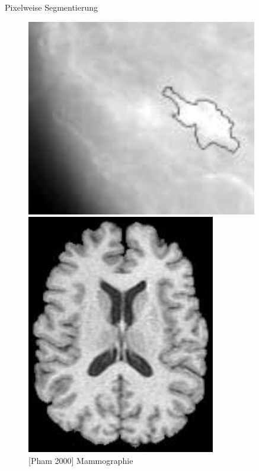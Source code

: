 \begin{frame}{Pixelweise Segmentierung}
    \begin{figure}[ht]
        \begin{minipage}[b]{0.45\linewidth}
            \centering
            \includegraphics[width=\textwidth]{../images/mammography.png}
            \caption{[Pham 2000] Mammographie}
            \label{fig:mammographie}
        \end{minipage}
        \hspace{0.5cm}
        \begin{minipage}[b]{0.45\linewidth}
            \centering
            \includegraphics[width=\textwidth]{../images/brain-mr.png}

\end{minipage}
\end{figure}
\end{frame}
